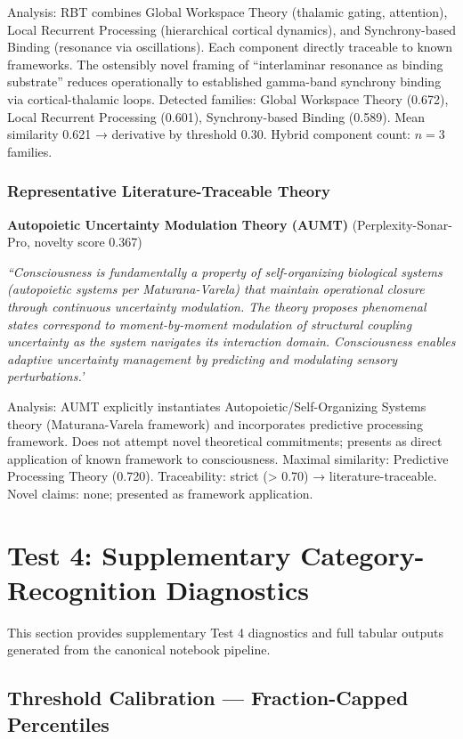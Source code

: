 Analysis: RBT combines Global Workspace Theory (thalamic gating, attention), Local Recurrent Processing (hierarchical cortical dynamics), and Synchrony-based Binding (resonance via oscillations). Each component directly traceable to known frameworks. The ostensibly novel framing of ``interlaminar resonance as binding substrate'' reduces operationally to established gamma-band synchrony binding via cortical-thalamic loops. Detected families: Global Workspace Theory (0.672), Local Recurrent Processing (0.601), Synchrony-based Binding (0.589). Mean similarity 0.621 → derivative by threshold 0.30. Hybrid component count: $n=3$ families.

\subsubsection{Representative Literature-Traceable Theory}

\textbf{Autopoietic Uncertainty Modulation Theory (AUMT)} (Perplexity-Sonar-Pro, novelty score 0.367)

\textit{``Consciousness is fundamentally a property of self-organizing biological systems (autopoietic systems per Maturana-Varela) that maintain operational closure through continuous uncertainty modulation. The theory proposes phenomenal states correspond to moment-by-moment modulation of structural coupling uncertainty as the system navigates its interaction domain. Consciousness enables adaptive uncertainty management by predicting and modulating sensory perturbations.'}

Analysis: AUMT explicitly instantiates Autopoietic/Self-Organizing Systems theory (Maturana-Varela framework) and incorporates predictive processing framework. Does not attempt novel theoretical commitments; presents as direct application of known framework to consciousness. Maximal similarity: Predictive Processing Theory (0.720). Traceability: strict (> 0.70) → literature-traceable. Novel claims: none; presented as framework application.

\section{Test 4: Supplementary Category-Recognition Diagnostics}
\label{sec:t4_appendix}

This section provides supplementary Test 4 diagnostics and full tabular outputs generated from the canonical notebook pipeline.

\subsection{Threshold Calibration --- Fraction-Capped Percentiles}

